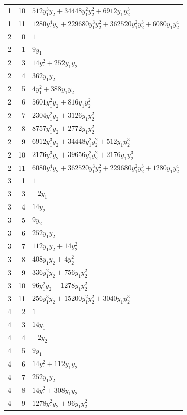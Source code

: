 \documentclass[10pt,a4paper]{article}
\begin{document}
{\begin{longtable}{rrp{125mm}}
1 & 10 & $512 y_{1}^{3} y_{2} + 34448 y_{1}^{2} y_{2}^{2} + 6912 y_{1} y_{2}^{3}$\\
1 & 11 & $1280 y_{1}^{4} y_{2} + 229680 y_{1}^{3} y_{2}^{2} + 362520 y_{1}^{2} y_{2}^{3} + 6080 y_{1} y_{2}^{4}$\\
2 & 0 & $1$\\
2 & 1 & $9 y_{1}$\\
2 & 3 & $14 y_{1}^{2} + 252 y_{1} y_{2}$\\
2 & 4 & $362 y_{1} y_{2}$\\
2 & 5 & $4 y_{1}^{2} + 388 y_{1} y_{2}$\\
2 & 6 & $5601 y_{1}^{2} y_{2} + 816 y_{1} y_{2}^{2}$\\
2 & 7 & $2304 y_{1}^{2} y_{2} + 3126 y_{1} y_{2}^{2}$\\
2 & 8 & $8757 y_{1}^{2} y_{2} + 2772 y_{1} y_{2}^{2}$\\
2 & 9 & $6912 y_{1}^{3} y_{2} + 34448 y_{1}^{2} y_{2}^{2} + 512 y_{1} y_{2}^{3}$\\
2 & 10 & $2176 y_{1}^{3} y_{2} + 39656 y_{1}^{2} y_{2}^{2} + 2176 y_{1} y_{2}^{3}$\\
2 & 11 & $6080 y_{1}^{4} y_{2} + 362520 y_{1}^{3} y_{2}^{2} + 229680 y_{1}^{2} y_{2}^{3} + 1280 y_{1} y_{2}^{4}$\\
3 & 1 & $1$\\
3 & 3 & $- 2 y_{1}$\\
3 & 4 & $14 y_{2}$\\
3 & 5 & $9 y_{2}$\\
3 & 6 & $252 y_{1} y_{2}$\\
3 & 7 & $112 y_{1} y_{2} + 14 y_{2}^{2}$\\
3 & 8 & $408 y_{1} y_{2} + 4 y_{2}^{2}$\\
3 & 9 & $336 y_{1}^{2} y_{2} + 756 y_{1} y_{2}^{2}$\\
3 & 10 & $96 y_{1}^{2} y_{2} + 1278 y_{1} y_{2}^{2}$\\
3 & 11 & $256 y_{1}^{3} y_{2} + 15200 y_{1}^{2} y_{2}^{2} + 3040 y_{1} y_{2}^{3}$\\
4 & 2 & $1$\\
4 & 3 & $14 y_{1}$\\
4 & 4 & $- 2 y_{2}$\\
4 & 5 & $9 y_{1}$\\
4 & 6 & $14 y_{1}^{2} + 112 y_{1} y_{2}$\\
4 & 7 & $252 y_{1} y_{2}$\\
4 & 8 & $14 y_{1}^{2} + 308 y_{1} y_{2}$\\
4 & 9 & $1278 y_{1}^{2} y_{2} + 96 y_{1} y_{2}^{2}$\\

\end{longtable}}
\end{document}
